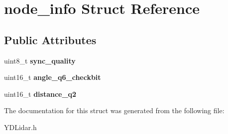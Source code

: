 \hypertarget{structnode__info}{}\section{node\+\_\+info Struct Reference}
\label{structnode__info}
\subsection*{Public Attributes}
\begin{DoxyCompactItemize}
\item 
uint8\+\_\+t {\bfseries sync\+\_\+quality}\hypertarget{structnode__info_a45f5ed4efbe416d43171d63c669f02da}{}\label{structnode__info_a45f5ed4efbe416d43171d63c669f02da}

\item 
uint16\+\_\+t {\bfseries angle\+\_\+q6\+\_\+checkbit}\hypertarget{structnode__info_a73e1d282a573f3daa74332fe29b90a26}{}\label{structnode__info_a73e1d282a573f3daa74332fe29b90a26}

\item 
uint16\+\_\+t {\bfseries distance\+\_\+q2}\hypertarget{structnode__info_a82eaf27a6196e803d3618c83b052f78c}{}\label{structnode__info_a82eaf27a6196e803d3618c83b052f78c}

\end{DoxyCompactItemize}


The documentation for this struct was generated from the following file\+:\begin{DoxyCompactItemize}
\item 
Y\+D\+Lidar.\+h\end{DoxyCompactItemize}

